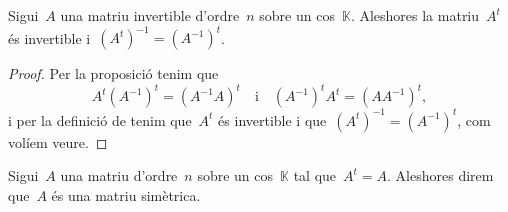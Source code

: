 \documentclass[../../main.tex]{subfiles}
\begin{document}
	\begin{proposition}
		\label{prop:transposada d'una invertible és invertible}
		Sigui~\(A\) una matriu invertible d'ordre~\(n\) sobre un cos~\(\mathbb{K}\).
		Aleshores la matriu~\(A^{t}\) és invertible i~\(\left(A^{t}\right)^{-1}=\left(A^{-1}\right)^{t}\).
		\begin{proof}
			Per la proposició  tenim que
			\[
			    A^{t}\left(A^{-1}\right)^{t}=\left(A^{-1}A\right)^{t}\quad\text{i}\quad \left(A^{-1}\right)^{t}A^{t}=\left(AA^{-1}\right)^{t},
			\]
			i per la definició de  tenim que~\(A^{t}\) és invertible i que~\(\left(A^{t}\right)^{-1}=\left(A^{-1}\right)^{t}\), com volíem veure.
		\end{proof}
	\end{proposition}
	\begin{definition}
		\label{def:matriu simètrica}
		Sigui~\(A\) una matriu d'ordre~\(n\) sobre un cos~\(\mathbb{K}\) tal que~\(A^{t}=A\).
		Aleshores direm que~\(A\) és una matriu simètrica.
	\end{definition}
\end{document}
